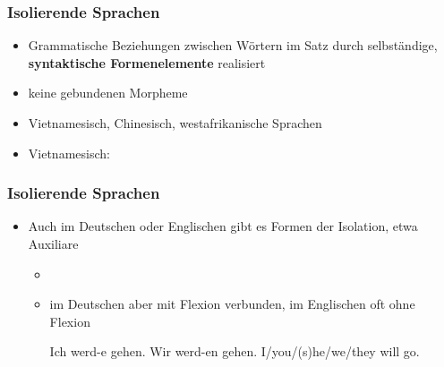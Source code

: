 \begin{frame}
\frametitle{Isolierende Sprachen}

\begin{itemize}
	\item Grammatische Beziehungen zwischen Wörtern im Satz durch selbständige, \textbf{syntaktische Formenelemente} realisiert
	\item[] \ras keine gebundenen Morpheme
	\item Vietnamesisch, Chinesisch, westafrikanische Sprachen
	
	\item[] Vietnamesisch:
	

\end{itemize}


\end{frame}

\begin{frame}
\frametitle{Isolierende Sprachen}

\begin{itemize}
	\item Auch im Deutschen oder Englischen gibt es Formen der Isolation, etwa Auxiliare
	
	\begin{itemize}
		\item[]
		\item im Deutschen aber mit Flexion verbunden, im Englischen oft ohne Flexion
		
		\eal 
			\ex Ich werd-e gehen.
			\ex Wir werd-en gehen.
			\ex I/you/(s)he/we/they will go.
		\zl
		
	\end{itemize}
\end{itemize}


\end{frame}


